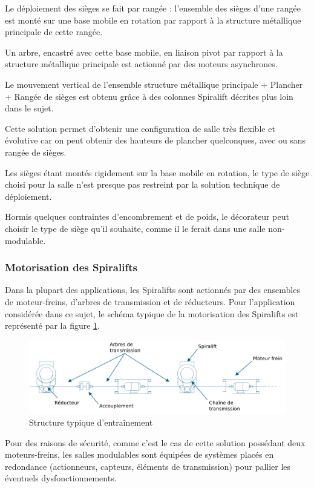Le déploiement des sièges se fait par rangée : l'ensemble des sièges d'une rangée est monté sur une base mobile en rotation par rapport à la structure métallique principale de cette rangée.

Un arbre, encastré avec cette base mobile, en liaison pivot par rapport à la structure métallique principale est actionné par des moteurs asynchrones.

Le mouvement vertical de l'ensemble {structure métallique principale + Plancher + Rangée de sièges} est obtenu grâce à des colonnes Spiralift décrites plus loin dans le sujet.

Cette solution permet d'obtenir une configuration de salle très flexible et évolutive car on peut obtenir des hauteurs de plancher quelconques, avec ou sans rangée de sièges.

Les sièges étant montés rigidement sur la base mobile en rotation, le type de siège choisi pour la salle n'est presque pas restreint par la solution technique de déploiement.

Hormis quelques contraintes d'encombrement et de poids, le décorateur peut choisir le type de siège qu'il souhaite, comme il le ferait dans une salle non-modulable.

\subsubsection{Motorisation des Spiralifts}

Dans la plupart des applications, les Spiralifts sont actionnés par des ensembles de moteur-freins, d'arbres de transmission et de réducteurs. Pour l'application considérée dans ce sujet, le schéma typique de la motorisation des Spiralifts est représenté par la figure \ref{fig04}.

\begin{figure}[!h]
 \centering\includegraphics[width=0.7\linewidth]{img/fig04}
 \caption{Structure typique d'entraînement}
 \label{fig04}
\end{figure}

Pour des raisons de sécurité, comme c'est le cas de cette solution possédant deux moteurs-freins, les salles modulables sont équipées de systèmes placés en redondance (actionneurs, capteurs, éléments de transmission) pour pallier les éventuels dysfonctionnements.

